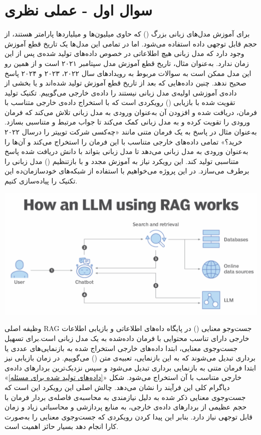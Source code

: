 \section{سوال اول - عملی نظری}

برای آموزش مدل‌های زبانی بزرگ () که حاوی میلیون‌ها و میلیارد‌ها پارامتر هستند، از حجم قابل توجهی داده استفاده می‌شود. اما در تمامی این مدل‌ها یک تاریخ قطع آموزش وجود دارد که مدل زبانی هیچ اطلاعاتی در خصوص داده‌های تولید شده‌ی پس از این زمان ندارد. به‌عنوان مثال، تاریخ قطع آموزش مدل  سپتامبر ۲۰۲۱ است و از همین رو این مدل ممکن است به سوالات مربوط به رویداد‌های سال ۲۰۲۲، ۲۰۲۳ و ۲۰۲۴ پاسخ صحیح ندهد. چنین داده‌هایی که بعد از تاریخ قطع آموزش تولید شده‌اند و یا بخشی از داده‌ی آموزشی اولیه‌ی مدل زبانی نیستند را داده‌ی خارجی می‌گوییم. تکنیک تولید تقویت شده با بازیابی () رویکردی است که با استخراج داده‌ی خارجی متناسب با فرمان، دریافت شده و افزودن آن به‌عنوان ورودی به مدل زبانی تلاش می‌کند که فرمان ورودی را تقویت کرده و به مدل زبانی کمک می‌کند تا جواب مرتبط و متناسبی بسازد. به‌عنوان مثال در پاسخ به یک فرمان متنی مانند «چه‌کسی شرکت توییتر را درسال ۲۰۲۲ خرید؟» تمامی داده‌های خارجی متناسب با این فرمان را استخراج می‌کند و آن‌ها را به‌عنوان ورودی به مدل زبانی 
می‌دهد تا مدل زبانی بتواند با دانش دریافت شده پاسخ متناسبی تولید کند. این رویکرد نیاز به آموزش مجدد و با باز‌تنظیم ()
مدل زبانی را برطرف می‌سازد. در این پروژه می‌خواهیم با استفاده از شبکه‌های خودسازمان‌ده این تکنیک را پیاده‌سازی کنیم.

\begin{center}
	\includegraphics*[width=0.8\linewidth]{pics/img1.png}
	\label{داده‌های تولید شده برای مسئله}
\end{center}


وظیفه اصلی RAG جست‌و‌جو معنایی () در پایگاه داه‌های اطلاعاتی و بازیابی اطلاعات خارجی دارای تناسب محتوایی با فرمان داده‌شده به یک مدل زبانی است.برای تسهیل جست‌و‌جوی معنایی، ابتدا داده‌های خارجی استخراج شده به بازنمایی‌های عددی یا برداری تبدیل می‌شوند که به این بازنمایی، تعبیه‌ی متن () می‌گوییم. در زمان بازیابی نیز ابتدا فرمان متنی به بازنمایی برداری تبدیل می‌شود و سپس نزدیک‌ترین بردار‌های داده‌ی خارجی متناسب با آن استخراج می‌شود. شکل «\textcolor{blue}{\ref{داده‌های تولید شده برای مسئله}}»
دیاگرام کلی این فرآیند را نشان می‌دهد. چالش اصلی این رویکرد این است که جست‌و‌جوی معنایی ذکر شده به دلیل نیازمندی به محاسبه‌ی فاصله‌ی بردار فرمان با حجم عظیمی از بردار‌های داده‌ی خارجی، به منابع پردازشی و محاسباتی زیاد و زمان قابل توجهی نیاز دارد. بنابر این پیدا کردن رویکردی که جست‌و‌جوی معنایی را به‌صورت کارا انجام دهد بسیار حائز اهمیت است.

